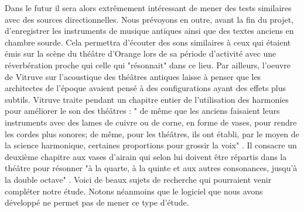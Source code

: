 Dans le futur il sera alors extrêmement intéressant de mener des tests similaires avec des sources directionnelles. Nous prévoyons en outre, avant la fin du projet, d'enregistrer les instruments de musique antiques ainsi que des textes anciens en chambre sourde. Cela permettra d'écouter des sons similaires à ceux qui étaient émis sur la scène du théâtre d'Orange lors de sa période d'activité avec une réverbération proche qui celle qui "résonnait" dans ce lieu. Par ailleurs, l'oeuvre de Vitruve sur l'acoustique des théâtres antiques \cite[Livre V]{vitruve} laisse à penser que les architectes de l'époque avaient pensé à des configurations ayant des effets plus subtils. Vitruve traite pendant un chapitre entier de l'utilisation des harmonies pour améliorer le son des théâtres : " de même que les anciens faisaient leurs instruments avec des lames de cuivre ou de corne, en forme de vases, pour rendre les cordes plus sonores; de même, pour les théâtres, ils ont établi, par le moyen de la science harmonique, certaines proportions pour grossir la voix" \cite[p.7]{vitruve}. Il consacre un deuxième chapitre aux vases d'airain qui selon lui doivent être répartis dans la théâtre pour résonner "à la quarte, à la quinte et aux autres consonances, jusqu'à la double octave" \cite[p.8]{vitruve}. Voici de beaux sujets de recherche qui pourraient venir compléter notre étude. Notons néanmoins que le logiciel que nous avons développé ne permet pas de mener ce type d'étude.

\newpage

 
 
